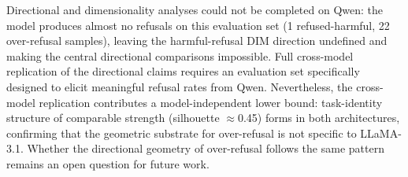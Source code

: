 \documentclass[11pt]{article}
\begin{document}
Directional and dimensionality analyses could not be completed on Qwen:
the model produces almost no refusals on this evaluation set (1
refused-harmful, 22 over-refusal samples), leaving the harmful-refusal
DIM direction undefined and making the central directional comparisons
impossible.
Full cross-model replication of the directional claims requires an
evaluation set specifically designed to elicit meaningful refusal rates
from Qwen.
Nevertheless, the cross-model replication contributes a model-independent
lower bound: task-identity structure of comparable strength (silhouette
$\approx$0.45) forms in both architectures, confirming that the geometric
substrate for over-refusal is not specific to LLaMA-3.1.
Whether the directional geometry of over-refusal follows the same pattern
remains an open question for future work.
\end{document}

